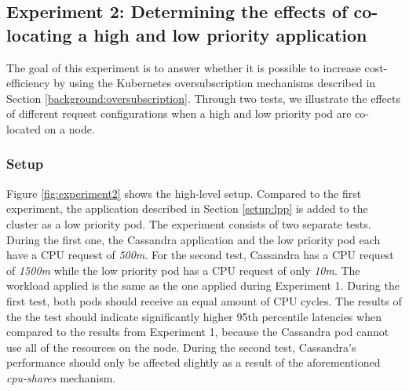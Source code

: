 %

\subsection{Experiment 2: Determining the effects of co-locating a high and low priority application}
The goal of this experiment is to answer whether it is possible to increase cost-efficiency by using the Kubernetes oversubscription mechanisms described in Section \ref{background:oversubscription}. Through two tests, we illustrate the effects of different request configurations when a high and low priority pod are co-located on a node.

\subsubsection{Setup}
Figure \ref{fig:experiment2} shows the high-level setup. Compared to the first experiment, the application described in Section \ref{setup:lpp} is added to the cluster as a low priority pod. The experiment consists of two separate tests. During the first one, the Cassandra application and the low priority pod each have a CPU request of \textit{500m}. For the second test, Cassandra has a CPU request of \textit{1500m} while the low priority pod has a CPU request of only \textit{10m}. The workload applied is the same as the one applied during Experiment 1. During the first test, both pods should receive an equal amount of CPU cycles. The results of the the test should indicate significantly higher 95th percentile latencies when compared to the results from Experiment 1, because the Cassandra pod cannot use all of the resources on the node. During the second test, Cassandra's performance should only be affected slightly as a result of the aforementioned \textit{cpu-shares} mechanism.

